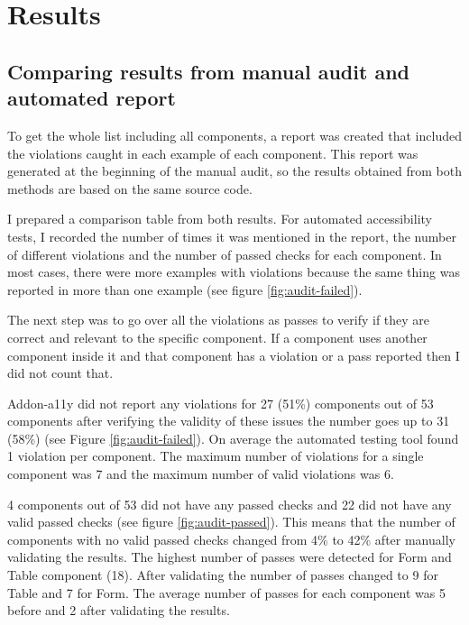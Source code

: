 \documentclass{master_thesis}
\begin{document}
\section{Results}


\subsection{Comparing results from manual audit and automated report}

To get the whole list including all components, a report was created that included the violations caught in each example of each component. This report was generated at the beginning of the manual audit, so the results obtained from both methods are based on the same source code.

I prepared a comparison table from both results. For automated accessibility tests, I recorded the number of times it was mentioned in the report, the number of different violations and the number of passed checks for each component. In most cases, there were more examples with violations because the same thing was reported in more than one example (see figure \ref{fig:audit-failed}).

The next step was to go over all the violations as passes to verify if they are correct and relevant to the specific component. If a component uses another component inside it and that component has a violation or a pass reported then I did not count that.

Addon-a11y did not report any violations for 27 (51\%) components out of 53 components after verifying the validity of these issues the number goes up to 31 (58\%) (see Figure \ref{fig:audit-failed}). On average the automated testing tool found 1 violation per component. The maximum number of violations for a single component was 7 and the maximum number of valid violations was 6.

4 components out of 53 did not have any passed checks and 22 did not have any valid passed checks (see figure \ref{fig:audit-passed}). This means that the number of components with no valid passed checks changed from 4\%  to 42\% after manually validating the results. The highest number of passes were detected for Form and Table component (18). After validating the number of passes changed to 9 for Table and 7 for Form. The average number of passes for each component was 5 before and 2 after validating the results.
\end{document}
